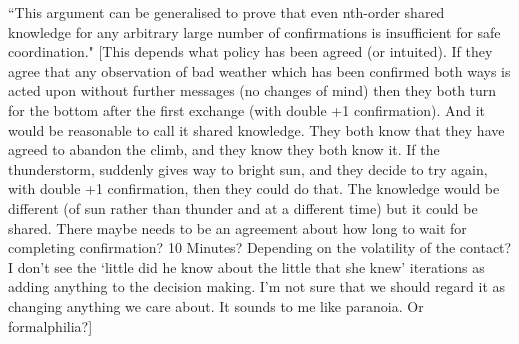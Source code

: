 \documentclass[a4paper]{article}
\begin{document}
``This argument can be generalised to prove that even nth-order shared knowledge for any arbitrary large number of confirmations is insufficient for safe coordination." [This depends what policy has been agreed (or intuited). If they agree that any observation of bad weather which has been confirmed both ways is acted upon without further messages (no changes of mind) then they both turn for the bottom after the first exchange (with double +1 confirmation). And it would be reasonable to call it shared knowledge. They both know that they have agreed to abandon the climb, and they know they both know it. If the thunderstorm, suddenly gives way to bright sun, and they decide to try again, with double +1 confirmation, then they could do that. The knowledge would be different (of sun rather than thunder and at a different time) but it could be shared. There maybe needs to be an agreement about how long to wait for completing confirmation? 10 Minutes? Depending on the volatility of the contact? I don't see the `little did he know about the little that she knew' iterations as adding anything to the decision making. I'm not sure that we should regard it as changing anything we care about. It sounds to me like paranoia. Or formalphilia?]
\end{document}
